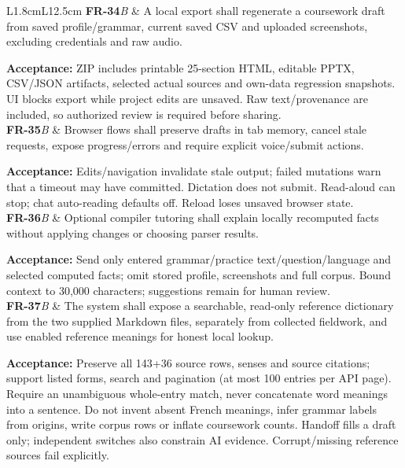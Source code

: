 \documentclass[11pt,a4paper]{article}
\newcommand{\requirement}[4]{\textbf{#1}\newline\textit{#2} & #3\par\smallskip\textbf{Acceptance:} #4\\\addlinespace}
\begin{document}
\begin{longtable}{L{1.8cm}L{12.5cm}}
\requirement{FR-34}{B}
{A local export shall regenerate a coursework draft from saved profile/grammar, current saved CSV and uploaded screenshots, excluding credentials and raw audio.}
{ZIP includes printable 25-section HTML, editable PPTX, CSV/JSON artifacts, selected actual sources and own-data regression snapshots. UI blocks export while project edits are unsaved. Raw text/provenance are included, so authorized review is required before sharing.}
\requirement{FR-35}{B}
{Browser flows shall preserve drafts in tab memory, cancel stale requests, expose progress/errors and require explicit voice/submit actions.}
{Edits/navigation invalidate stale output; failed mutations warn that a timeout may have committed. Dictation does not submit. Read-aloud can stop; chat auto-reading defaults off. Reload loses unsaved browser state.}
\requirement{FR-36}{B}
{Optional compiler tutoring shall explain locally recomputed facts without applying changes or choosing parser results.}
{Send only entered grammar/practice text/question/language and selected computed facts; omit stored profile, screenshots and full corpus. Bound context to 30,000 characters; suggestions remain for human review.}
\requirement{FR-37}{B}
{The system shall expose a searchable, read-only reference dictionary from the two supplied Markdown files, separately from collected fieldwork, and use enabled reference meanings for honest local lookup.}
{Preserve all 143+36 source rows, senses and source citations; support listed forms, search and pagination (at most 100 entries per API page). Require an unambiguous whole-entry match, never concatenate word meanings into a sentence. Do not invent absent French meanings, infer grammar labels from origins, write corpus rows or inflate coursework counts. Handoff fills a draft only; independent switches also constrain AI evidence. Corrupt/missing reference sources fail explicitly.}
\bottomrule\end{longtable}
\end{document}
